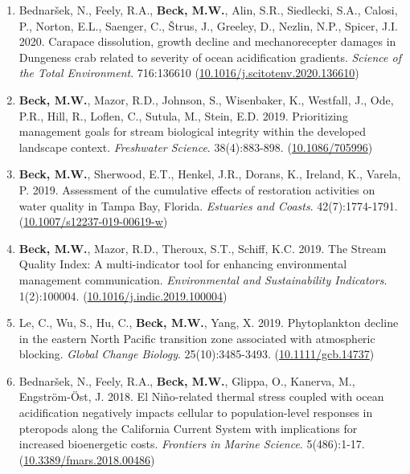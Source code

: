 \documentclass[letterpaper,12pt]{article}
\begin{document}
\begin{enumerate}
\item Bednar\v{s}ek, N., Feely, R.A., \textbf{Beck, M.W.}, Alin, S.R., Siedlecki, S.A., Calosi, P., Norton, E.L., Saenger, C., \v{S}trus, J., Greeley, D., Nezlin, N.P., Spicer, J.I. 2020. Carapace dissolution, growth decline and mechanorecepter damages in {D}ungeness crab related to severity of ocean acidification gradients. \textit{Science of the Total Environment}. 716:136610 ({\footnotesize\href{https://doi.org/10.1016/j.scitotenv.2020.136610}{10.1016/j.scitotenv.2020.136610}})

\item \textbf{Beck, M.W.}, Mazor, R.D., Johnson, S., Wisenbaker, K., Westfall, J., Ode, P.R., Hill, R., Loflen, C., Sutula, M., Stein, E.D. 2019. Prioritizing management goals for stream biological integrity within the developed landscape context. \textit{Freshwater Science}. 38(4):883-898. ({\footnotesize\href{https://doi.org/10.1086/705996}{10.1086/705996}})

\item \textbf{Beck, M.W.}, Sherwood, E.T., Henkel, J.R., Dorans, K., Ireland, K., Varela, P. 2019. Assessment of the cumulative effects of restoration activities on water quality in Tampa Bay, Florida. \textit{Estuaries and Coasts}. 42(7):1774-1791. ({\footnotesize\href{https://doi.org/10.1007/s12237-019-00619-w}{10.1007/s12237-019-00619-w}})

\item \textbf{Beck, M.W.}, Mazor, R.D., Theroux, S.T., Schiff, K.C. 2019. The Stream Quality Index: A multi-indicator tool for enhancing environmental management communication. \textit{Environmental and Sustainability Indicators}. 1(2):100004. ({\footnotesize\href{https://doi.org/10.1016/j.indic.2019.100004}{10.1016/j.indic.2019.100004}})

\item Le, C., Wu, S., Hu, C., \textbf{Beck, M.W.}, Yang, X. 2019. Phytoplankton decline in the eastern {N}orth {P}acific transition zone associated with atmospheric blocking. \textit{Global Change Biology}. 25(10):3485-3493. ({\footnotesize\href{https://doi.org/10.1111/gcb.14737}{10.1111/gcb.14737}})

\item Bednar\v{s}ek, N., Feely, R.A., \textbf{Beck, M.W.}, Glippa, O., Kanerva, M., Engstr\"{o}m-\"{O}st, J. 2018. El Ni\~{n}o-related thermal stress coupled with ocean acidification negatively impacts cellular to population-level responses in pteropods along the {C}alifornia {C}urrent {S}ystem with implications for increased bioenergetic costs. \textit{Frontiers in Marine Science}. 5(486):1-17. ({\footnotesize\href{https://doi.org/10.3389/fmars.2018.00486}{10.3389/fmars.2018.00486}})


\end{enumerate}
\end{document}
